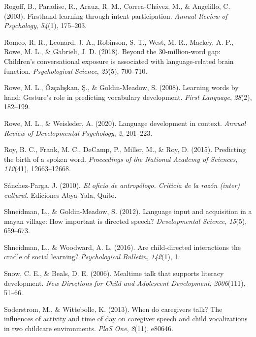 \documentclass[
  man,floatsintext]{apa6}
\newlength{\cslhangindent}
\newlength{\cslentryspacingunit} %
\newenvironment{CSLReferences}[2] %
 {%
  \setlength{\parindent}{0pt}
  \ifodd #1
  \let\oldpar\par
  \def\par{\hangindent=\cslhangindent\oldpar}
  \fi
  \setlength{\parskip}{#2\cslentryspacingunit}
 }%
 {}
\begin{document}
\begin{CSLReferences}{1}{0}
\leavevmode{}%
Rogoff, B., Paradise, R., Arauz, R. M., Correa-Chávez, M., \& Angelillo, C. (2003). Firsthand learning through intent participation. \emph{Annual Review of Psychology}, \emph{54}(1), 175--203.

\leavevmode{}%
Romeo, R. R., Leonard, J. A., Robinson, S. T., West, M. R., Mackey, A. P., Rowe, M. L., \& Gabrieli, J. D. (2018). Beyond the 30-million-word gap: Children's conversational exposure is associated with language-related brain function. \emph{Psychological Science}, \emph{29}(5), 700--710.

\leavevmode{}%
Rowe, M. L., Özçalışkan, Ş., \& Goldin-Meadow, S. (2008). Learning words by hand: Gesture's role in predicting vocabulary development. \emph{First Language}, \emph{28}(2), 182--199.

\leavevmode{}%
Rowe, M. L., \& Weisleder, A. (2020). Language development in context. \emph{Annual Review of Developmental Psychology}, \emph{2}, 201--223.

\leavevmode{}%
Roy, B. C., Frank, M. C., DeCamp, P., Miller, M., \& Roy, D. (2015). Predicting the birth of a spoken word. \emph{Proceedings of the National Academy of Sciences}, \emph{112}(41), 12663--12668.

\leavevmode{}%
Sánchez-Parga, J. (2010). \emph{El oficio de antrop{ó}logo. Cr{í}ticia de la raz{ó}n (inter) cultural.} Ediciones Abya-Yala, Quito.

\leavevmode{}%
Shneidman, L., \& Goldin-Meadow, S. (2012). Language input and acquisition in a mayan village: How important is directed speech? \emph{Developmental Science}, \emph{15}(5), 659--673.

\leavevmode{}%
Shneidman, L., \& Woodward, A. L. (2016). Are child-directed interactions the cradle of social learning? \emph{Psychological Bulletin}, \emph{142}(1), 1.

\leavevmode{}%
Snow, C. E., \& Beals, D. E. (2006). Mealtime talk that supports literacy development. \emph{New Directions for Child and Adolescent Development}, \emph{2006}(111), 51--66.

\leavevmode{}%
Soderstrom, M., \& Wittebolle, K. (2013). When do caregivers talk? The influences of activity and time of day on caregiver speech and child vocalizations in two childcare environments. \emph{PloS One}, \emph{8}(11), e80646.


\end{CSLReferences}
\end{document}
